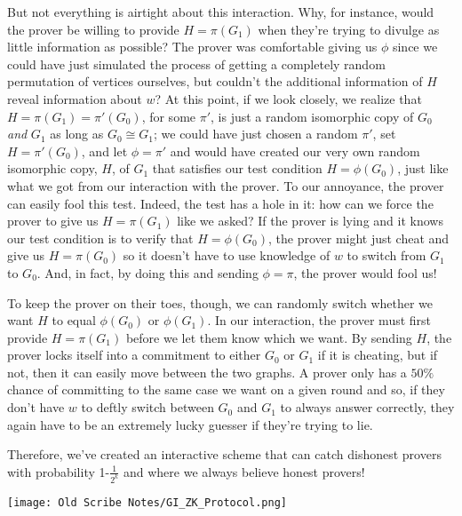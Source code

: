 	But not everything is airtight about this interaction.  Why, for instance, would the prover be willing to provide $H=\pi(G_1)$ when they're trying to divulge as little information as possible?  The prover was comfortable giving us $\phi$ since we could have just simulated the process of getting a completely random permutation of vertices ourselves, but couldn't the additional information of $H$ reveal information about $w$?  At this point, if we look closely, we realize that $H=\pi(G_1)=\pi'(G_0)$, for some $\pi'$, is just a random isomorphic copy of $G_0$ \textit{and} $G_1$ as long as $G_0 \cong G_1$; we could have just chosen a random $\pi'$, set $H=\pi'(G_0)$, and let $\phi=\pi'$ and would have created our very own random isomorphic copy, $H$, of $G_1$ that satisfies our test condition $H=\phi(G_0)$, just like what we got from our interaction with the prover. To our annoyance, the prover can easily fool this test. Indeed, the test has a hole in it: how can we force the prover to give us $H=\pi(G_1)$ like we asked?  If the prover is lying and it knows our test condition is to verify that $H=\phi(G_0)$, the prover might just cheat and give us $H=\pi(G_0)$ so it doesn't have to use knowledge of $w$ to switch from $G_1$ to $G_0$.  And, in fact, by doing this and sending $\phi=\pi$, the prover would fool us!
		
	To keep the prover on their toes, though, we can randomly switch whether we want $H$ to equal $\phi(G_0)$ or $\phi(G_1)$.  In our interaction, the prover must first provide $H=\pi(G_1)$ before we let them know which we want. By sending $H$, the prover locks itself into a commitment to either $G_0$ or $G_1$ if it is cheating, but if not, then it can easily move between the two graphs. A prover only has a $50\%$ chance of committing to the same case we want on a given round and so, if they don't have $w$ to deftly switch between $G_0$ and $G_1$ to always answer correctly, they again have to be an extremely lucky guesser if they're trying to lie.
		
	Therefore, we've created an interactive scheme that can catch dishonest provers with probability 1-$\frac{1}{2^k}$ and where we always believe honest provers!
		
		\begin{center}
			\texttt{[image: Old Scribe Notes/GI\_ZK\_Protocol.png]}
		\end{center}
		
